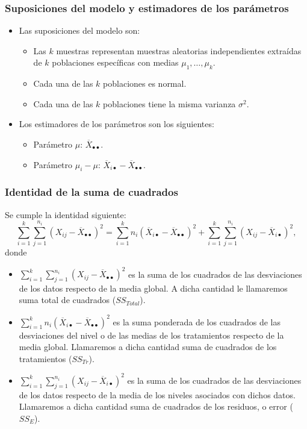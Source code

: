 \begin{frame}
\frametitle{Suposiciones del modelo y estimadores de los parámetros}
\begin{itemize}
\item<2-> Las suposiciones del modelo son:
\begin{itemize}
\item<3-> Las $k$ muestras representan muestras aleatorias independientes extraídas de $k$ poblaciones específicas con medias $\mu_1,\ldots,\mu_k$.
\item<4-> Cada una de las $k$ poblaciones es normal.
\item<5-> Cada una de las $k$ poblaciones tiene la misma varianza $\sigma^2$.
\end{itemize}
\item<6-> Los estimadores de los parámetros son los siguientes:
\begin{itemize}
\item<7-> Parámetro $\mu$: $\overline{X}_{\bullet\bullet}$.
\item<8-> Parámetro $\mu_i-\mu$: $\overline{X}_{i\bullet}-\overline{X}_{\bullet\bullet}$.
\end{itemize}
\end{itemize}
\end{frame}
\begin{frame}
\frametitle{Identidad de la suma de cuadrados}
Se cumple la identidad siguiente:
\[
\sum_{i=1}^k\sum_{j=1}^{n_i} (X_{ij}-\overline{X}_{\bullet\bullet})^2 =  \sum_{i=1}^k n_i (\overline{X}_{i\bullet}-\overline{X}_{\bullet\bullet})^2 +
\sum_{i=1}^k\sum_{j=1}^{n_i} (X_{ij}-\overline{X}_{i\bullet})^2,
\]
donde
{\small
\begin{itemize}
\item<2-> $\sum_{i=1}^k\sum_{j=1}^{n_i} (X_{ij}-\overline{X}_{\bullet\bullet})^2 $ es la suma de los cuadrados de las desviaciones de los datos
respecto de la media global. A dicha cantidad le llamaremos suma total de cuadrados ($SS_{Total}$).
\item<3-> $\sum_{i=1}^k n_i (\overline{X}_{i\bullet}-\overline{X}_{\bullet\bullet})^2$ es la suma ponderada de los cuadrados de las desviaciones del
nivel o de las medias de los tratamientos respecto de la media global. Llamaremos a dicha cantidad suma de cuadrados de los tratamientos ($SS_{Tr}$).
\item<4->$\sum_{i=1}^k\sum_{j=1}^{n_i} (X_{ij}-\overline{X}_{i\bullet})^2$ es la suma de los cuadrados de las desviaciones de los datos respecto de
la media de los niveles asociados con dichos datos. Llamaremos a dicha cantidad suma de cuadrados de los residuos, o error ($SS_E$).
\end{itemize}} 
\end{frame}
